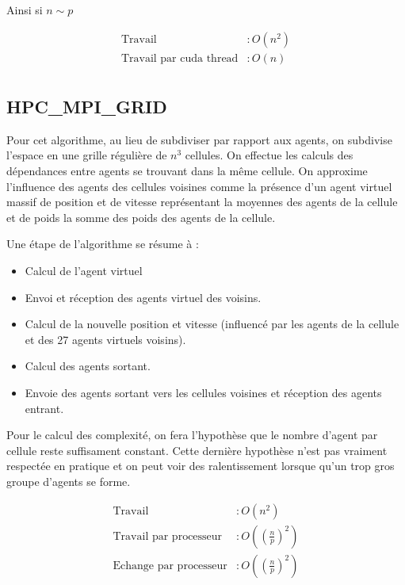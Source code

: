 \documentclass[liens,entete-ensimag,margeCorrection]{ensirapport}
\begin{document}
Ainsi si $n \sim p$

\begin{align*}
    \text{Travail} &: O\left( n^2 \right) \\
    \text{Travail par cuda thread} &: O\left( n \right)  \\
\end{align*}

\subsection{HPC\_MPI\_GRID}

Pour cet algorithme, au lieu de subdiviser par rapport aux agents, on subdivise l'espace en une grille régulière de $n^3$ cellules.
On effectue les calculs des dépendances entre agents se trouvant dans la même cellule.
On approxime l'influence des agents des cellules voisines comme la présence d'un agent virtuel massif de position et de vitesse représentant la moyennes des agents de la cellule et de poids la somme des poids des agents de la cellule.

Une étape de l'algorithme se résume à :
\begin{itemize}
    \item Calcul de l'agent virtuel
    \item Envoi et réception des agents virtuel des voisins.
    \item Calcul de la nouvelle position et vitesse (influencé par les agents de la cellule et des 27 agents virtuels voisins).
    \item Calcul des agents sortant.
    \item Envoie des agents sortant vers les cellules voisines et réception des agents entrant.
\end{itemize}

Pour le calcul des complexité, on fera l'hypothèse que le nombre d'agent par cellule reste suffisament constant.
Cette dernière hypothèse n'est pas vraiment respectée en pratique et on peut voir des ralentissement lorsque qu'un trop gros groupe d'agents se forme.

\begin{align*}
    \text{Travail} &: O\left( n^2 \right) \\
    \text{Travail par processeur} &: O\left( \left(\frac np \right)^2 \right)  \\
    \text{Echange par processeur} &: O\left( \left(\frac np \right)^2 \right)
\end{align*}
\end{document}
